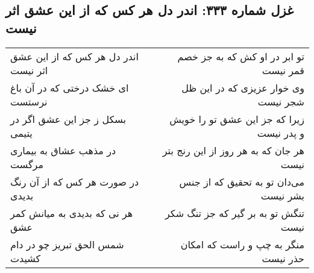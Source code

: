 \begin{center}
\section*{غزل شماره ۳۳۳: اندر دل هر کس که از این عشق اثر نیست}
\label{sec:0333}
\begin{longtable}{l p{0.5cm} r}
اندر دل هر کس که از این عشق اثر نیست
&&
تو ابر در او کش که به جز خصم قمر نیست
\\
ای خشک درختی که در آن باغ نرستست
&&
وی خوار عزیزی که در این ظل شجر نیست
\\
بسکل ز جز این عشق اگر در یتیمی
&&
زیرا که جز این عشق تو را خویش و پدر نیست
\\
در مذهب عشاق به بیماری مرگست
&&
هر جان که به هر روز از این رنج بتر نیست
\\
در صورت هر کس که از آن رنگ بدیدی
&&
می‌دان تو به تحقیق که از جنس بشر نیست
\\
هر نی که بدیدی به میانش کمر عشق
&&
تنگش تو به بر گیر که جز تنگ شکر نیست
\\
شمس الحق تبریز چو در دام کشیدت
&&
منگر به چپ و راست که امکان حذر نیست
\\
\end{longtable}
\end{center}
